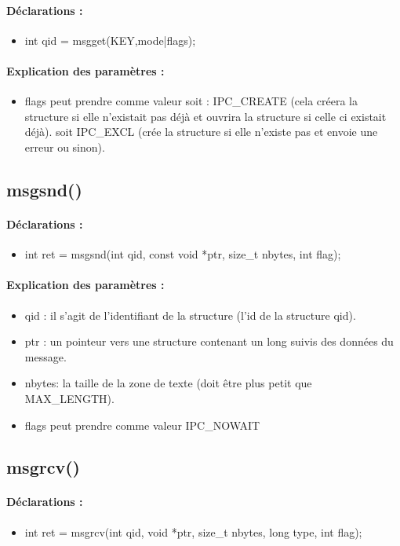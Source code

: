 \documentclass{article}[12pt]
\begin{document}
\paragraph{Déclarations : }
\begin{itemize}
	\item int qid = msgget(KEY,mode|flags);
\end{itemize}
\paragraph{Explication des paramètres : }
\begin{itemize}
	\item flags peut prendre comme valeur soit : IPC\_CREATE (cela créera la structure si elle n'existait pas déjà et ouvrira la structure si celle ci existait déjà). soit IPC\_EXCL (crée la structure si elle n'existe pas et envoie une erreur ou sinon).   
\end{itemize}
\subsection{msgsnd()}
\paragraph{Déclarations : }
\begin{itemize}
	\item int ret = msgsnd(int qid, const void *ptr, size\_t nbytes, int flag); 
\end{itemize}
\paragraph{Explication des paramètres : }
\begin{itemize}
\item qid : il s'agit de l'identifiant de la structure (l'id de la structure qid). 
\item ptr : un pointeur vers une structure contenant un long suivis des données du message.
\item nbytes: la taille de la zone de texte (doit être plus petit que MAX\_LENGTH).
\item flags peut prendre comme valeur IPC\_NOWAIT  
\end{itemize}
\subsection{msgrcv()}
\paragraph{Déclarations : }
\begin{itemize}
	\item int ret = msgrcv(int qid, void *ptr, size\_t nbytes, long type, int flag); 
\end{itemize}
\end{document}
